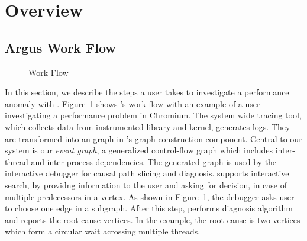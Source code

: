 \section{Overview}\label{sec:overview}

\subsection{Argus Work Flow}
\begin{figure}[tb]
    \centering
	
    \caption{\xxx Work Flow}
    \label{fig:argus-overview}
\end{figure}

In this section, we describe the steps a user takes to investigate a performance
anomaly with \xxx. Figure~\ref{fig:argus-overview} shows \xxx's work flow with
an example of a user investigating a performance problem in Chromium. The system
wide tracing tool, which collects data from \xxx instrumented library and
kernel, generates logs. They are transformed into an graph in \xxx's
graph construction component. 
Central to our system is our \emph{event graph}, a generalized control-flow
graph which includes inter-thread and inter-process dependencies.
The generated graph is used by the interactive
debugger for causal path slicing and diagnosis. \xxx supports interactive
search, by providng information to the user and asking for decision, in case of
multiple predecessors in a vertex. As shown in Figure~\ref{fig:argus-overview},
the debugger asks user to choose one edge in a subgraph. After this step,
\xxx performs diagnosis algorithm and reports the root cause vertices. In the
example, the root cause is two vertices which form a circular wait acrossing
multiple threads.
%
